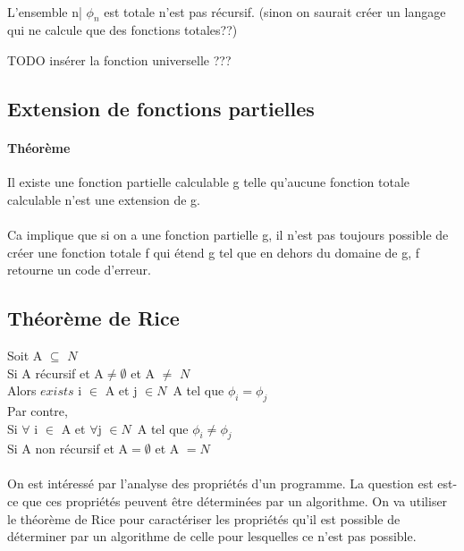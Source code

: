 \documentclass[11pt,a4paper]{article}
\begin{document}
\paragraph{} L'ensemble {n| $\phi_n$ est totale} n'est pas récursif. (sinon on 
saurait créer un langage qui ne calcule que des fonctions totales??)

TODO insérer la fonction universelle ???


\subsection{Extension de fonctions partielles}
\label{sub:extension_de_fonctions_partielles}
\paragraph{Théorème} Il existe une fonction partielle calculable g telle 
qu'aucune fonction totale calculable n'est une extension de g.

\paragraph{} Ca implique que si on a une fonction partielle g, il n'est pas 
toujours possible de créer une fonction totale f qui étend g
tel que en dehors du domaine de g, f retourne un code d'erreur.


\subsection{Théorème de Rice}
\label{sub:th_or_me_de_rice}
Soit A $\subseteq$ $N$ \\
Si A récursif et A$\neq \emptyset$ et A $\neq$ $N$ \\
Alors $exists$ i $\in$ A et j $\in N$\ A tel que $\phi _i = \phi _j$ \\

Par contre, \\
Si $\forall$ i $\in$ A et $\forall$j $\in N$\ A tel que $\phi_i \neq \phi_j$ \\
Si A non récursif et A$=\emptyset$ et A $= N$ \\

\paragraph{} On est intéressé par l'analyse des propriétés d'un programme. La 
question est est-ce que ces propriétés peuvent être déterminées par un 
algorithme. On va utiliser le théorème de Rice pour caractériser les propriétés 
qu'il est possible de déterminer par un algorithme de celle pour lesquelles ce 
n'est pas possible.
\end{document}
